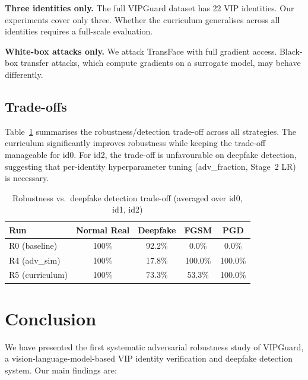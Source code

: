 \documentclass[12pt,a4paper]{article}
\begin{document}
\textbf{Three identities only.}  The full VIPGuard dataset has 22 VIP
identities.  Our experiments cover only three.  Whether the curriculum
generalises across all identities requires a full-scale evaluation.

\textbf{White-box attacks only.}  We attack TransFace with full gradient access.
Black-box transfer attacks, which compute gradients on a surrogate model,
may behave differently.

\subsection{Trade-offs}

Table~\ref{tab:tradeoff} summarises the robustness/detection trade-off across
all strategies.  The curriculum significantly improves robustness while keeping
the trade-off manageable for id0.  For id2, the trade-off is unfavourable on
deepfake detection, suggesting that per-identity hyperparameter tuning (adv\_fraction,
Stage~2 LR) is necessary.

\begin{table}[H]
\centering
\caption{Robustness vs.\ deepfake detection trade-off (averaged over id0, id1, id2)}
\label{tab:tradeoff}
\begin{tabular}{@{}lcccc@{}}
\toprule
\textbf{Run} & \textbf{Normal Real} & \textbf{Deepfake} & \textbf{FGSM} & \textbf{PGD} \\
\midrule
R0 (baseline)   & 100\% & 92.2\% &  0.0\% &  0.0\% \\
R4 (adv\_sim)   & 100\% & 17.8\% & 100.0\% & 100.0\% \\
R5 (curriculum) & 100\% & 73.3\% &  53.3\% & 100.0\% \\
\bottomrule
\end{tabular}
\end{table}

\section{Conclusion}

We have presented the first systematic adversarial robustness study of VIPGuard,
a vision-language-model-based VIP identity verification and deepfake detection
system.  Our main findings are:
\end{document}
